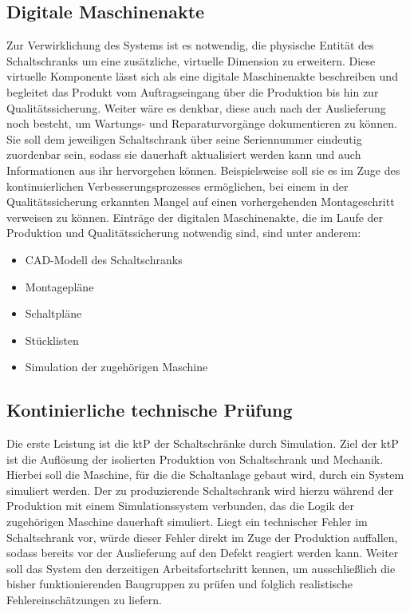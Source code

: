 \documentclass[
    type=Prakikumsbericht,
    status=draft, %
    language=german, %
    bibengine=bibtex,
]{unibwm-inf-thesis}
\begin{document}
    \subsection{Digitale Maschinenakte}\label{subsec:digitale-maschinenakte}
    Zur Verwirklichung des Systems ist es notwendig, die physische Entität des Schaltschranks um eine zusätzliche,
    virtuelle Dimension zu erweitern.
    Diese virtuelle Komponente lässt sich als eine digitale Maschinenakte beschreiben und begleitet das Produkt vom
    Auftragseingang über die Produktion bis hin zur Qualitätssicherung.
    Weiter wäre es denkbar, diese auch nach der Auslieferung noch besteht, um Wartungs- und Reparaturvorgänge
    dokumentieren zu können.
    Sie soll dem jeweiligen Schaltschrank über seine Seriennummer eindeutig zuordenbar sein, sodass sie dauerhaft
    aktualisiert werden kann und auch Informationen aus ihr hervorgehen können.
    Beispielsweise soll sie es im Zuge des kontinuierlichen Verbesserungsprozesses ermöglichen, bei einem in der
    Qualitätssicherung erkannten Mangel auf einen vorhergehenden Montageschritt verweisen zu können.
    Einträge der digitalen Maschinenakte, die im Laufe der Produktion und Qualitätssicherung notwendig sind, sind unter
    anderem:
    \begin{itemize}
        \item CAD-Modell des Schaltschranks
        \item Montagepläne
        \item Schaltpläne
        \item Stücklisten
        \item Simulation der zugehörigen Maschine
    \end{itemize}



    \subsection{Kontinierliche technische Prüfung}\label{subsec:kontinierliche-technische-prufung}
    Die erste Leistung ist die \ac{ktP} der Schaltschränke durch Simulation.
    Ziel der \ac{ktP} ist die Auflösung der isolierten Produktion von Schaltschrank und Mechanik.
    Hierbei soll die Maschine, für die die Schaltanlage gebaut wird, durch ein System simuliert werden.
    Der zu produzierende Schaltschrank wird hierzu während der Produktion mit einem Simulationssystem verbunden, das die Logik der zugehörigen Maschine dauerhaft simuliert.
    Liegt ein technischer Fehler im Schaltschrank vor, würde dieser Fehler direkt im Zuge der Produktion auffallen, sodass bereits vor der Auslieferung auf den Defekt reagiert werden kann.
    Weiter soll das System den derzeitigen Arbeitsfortschritt kennen, um ausschließlich die bisher funktionierenden Baugruppen zu prüfen und folglich realistische Fehlereinschätzungen zu liefern.
\end{document}
